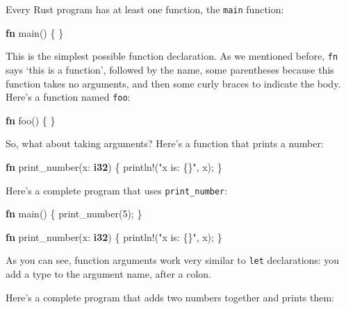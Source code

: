 \documentclass[a4paper,]{book}
\newenvironment{Shaded}{\begin{snugshade}}{\end{snugshade}}
\newcommand{\KeywordTok}[1]{\textcolor[rgb]{0.13,0.29,0.53}{\textbf{{#1}}}}
\newcommand{\DecValTok}[1]{\textcolor[rgb]{0.00,0.00,0.81}{{#1}}}
\newcommand{\StringTok}[1]{\textcolor[rgb]{0.31,0.60,0.02}{{#1}}}
\newcommand{\OtherTok}[1]{\textcolor[rgb]{0.56,0.35,0.01}{{#1}}}
\newcommand{\NormalTok}[1]{{#1}}
\begin{document}
Every Rust program has at least one function, the \texttt{main}
function:

\begin{Shaded}
\begin{Highlighting}[]
\KeywordTok{fn} \NormalTok{main() \{}
\NormalTok{\}}
\end{Highlighting}
\end{Shaded}

This is the simplest possible function declaration. As we mentioned
before, \texttt{fn} says `this is a function', followed by the name,
some parentheses because this function takes no arguments, and then some
curly braces to indicate the body. Here's a function named \texttt{foo}:

\begin{Shaded}
\begin{Highlighting}[]
\KeywordTok{fn} \NormalTok{foo() \{}
\NormalTok{\}}
\end{Highlighting}
\end{Shaded}

So, what about taking arguments? Here's a function that prints a number:

\begin{Shaded}
\begin{Highlighting}[]
\KeywordTok{fn} \NormalTok{print_number(x: }\KeywordTok{i32}\NormalTok{) \{}
    \OtherTok{println!}\NormalTok{(}\StringTok{"x is: \{\}"}\NormalTok{, x);}
\NormalTok{\}}
\end{Highlighting}
\end{Shaded}

Here's a complete program that uses \texttt{print\_number}:

\begin{Shaded}
\begin{Highlighting}[]
\KeywordTok{fn} \NormalTok{main() \{}
    \NormalTok{print_number(}\DecValTok{5}\NormalTok{);}
\NormalTok{\}}

\KeywordTok{fn} \NormalTok{print_number(x: }\KeywordTok{i32}\NormalTok{) \{}
    \OtherTok{println!}\NormalTok{(}\StringTok{"x is: \{\}"}\NormalTok{, x);}
\NormalTok{\}}
\end{Highlighting}
\end{Shaded}

As you can see, function arguments work very similar to \texttt{let}
declarations: you add a type to the argument name, after a colon.

Here's a complete program that adds two numbers together and prints
them:
\end{document}
